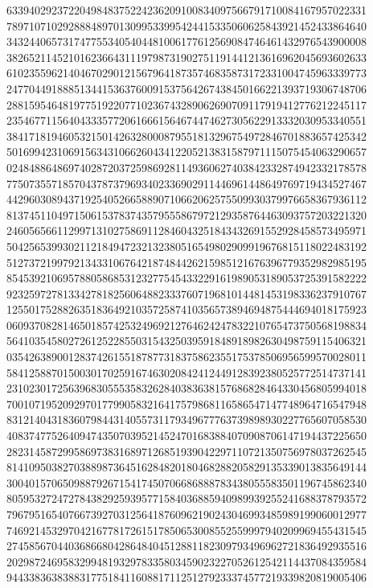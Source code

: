 {    6339402923722049848375224236209100834097566791710084167957022331 ~
    7897107102928884897013099533995424415335060625843921452433864640 ~
    3432440657317477553405404481006177612569084746461432976543900008 ~
    3826521145210162366431119798731902751191441213616962045693602633 ~
    6102355962140467029012156796418735746835873172331004745963339773 ~
    2477044918885134415363760091537564267438450166221393719306748706 ~
    2881595464819775192207710236743289062690709117919412776212245117 ~
    2354677115640433357720616661564674474627305622913332030953340551 ~
    3841718194605321501426328000879551813296754972846701883657425342 ~
    5016994231069156343106626043412205213831587971115075454063290657 ~
    0248488648697402872037259869281149360627403842332874942332178578 ~
    7750735571857043787379693402336902911446961448649769719434527467 ~
    4429603089437192540526658890710662062575509930379976658367936112 ~
    8137451104971506153783743579555867972129358764463093757203221320 ~
    2460565661129971310275869112846043251843432691552928458573495971 ~
    5042565399302112184947232132380516549802909919676815118022483192 ~
    5127372199792134331067642187484426215985121676396779352982985195 ~
    8545392106957880586853123277545433229161989053189053725391582222 ~
    9232597278133427818256064882333760719681014481453198336237910767 ~
    1255017528826351836492103572587410356573894694875444694018175923 ~
    0609370828146501857425324969212764624247832210765473750568198834 ~
    5641035458027261252285503154325039591848918982630498759115406321 ~
    0354263890012837426155187877318375862355175378506956599570028011 ~
    5841258870150030170259167463020842412449128392380525772514737141 ~
    2310230172563968305553583262840383638157686828464330456805994018 ~
    7001071952092970177990583216417579868116586547147748964716547948 ~
    8312140431836079844314055731179349677763739898930227765607058530 ~
    4083747752640947435070395214524701683884070908706147194437225650 ~
    2823145872995869738316897126851939042297110721350756978037262545 ~
    8141095038270388987364516284820180468288205829135339013835649144 ~
    3004015706509887926715417450706686888783438055583501196745862340 ~
    8059532724727843829259395771584036885940989939255241688378793572 ~
    7967951654076673927031256418760962190243046993485989199060012977 ~
    7469214532970421677817261517850653008552559997940209969455431545 ~
    2745856704403686680428648404512881182309793496962721836492935516 ~
    2029872469583299481932978335803459023227052612542114437084359584 ~
    9443383638388317751841160881711251279233374577219339820819005406 ~
}
